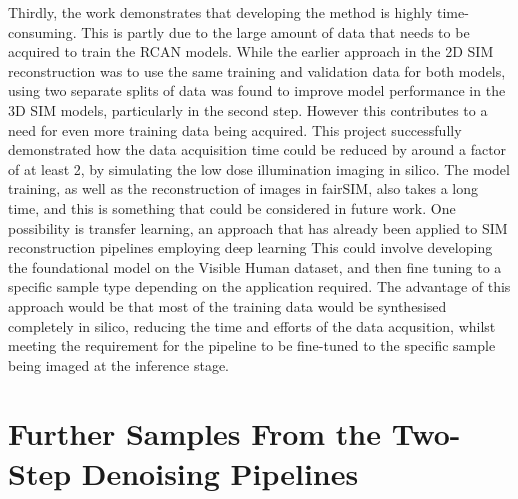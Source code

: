 \documentclass[12pt]{article}
\begin{document}
Thirdly, the work demonstrates that developing the method is highly time-consuming.
This is partly due to the large amount of data that needs to be acquired to train the RCAN models.
While the earlier approach in the 2D SIM reconstruction was to use the same training and validation data for both models,
using two separate splits of data was found to improve model performance in the 3D SIM models,
particularly in the second step.
However this contributes to a need for even more training data being acquired.
This project successfully demonstrated how the data acquisition time could be reduced by around a factor of at least 2,
by simulating the low dose illumination imaging in silico.
The model training, as well as the reconstruction of images in fairSIM,
also takes a long time, and this is something that could be considered in future work.
One possibility is transfer learning, an approach that has already been applied to SIM reconstruction pipelines employing deep learning \cite{mlsim}
This could involve developing the foundational model on the Visible Human dataset,
and then fine tuning to a specific sample type depending on the application required.
The advantage of this approach would be that most of the training data would be synthesised completely in silico,
reducing the time and efforts of the data acqusition,
whilst meeting the requirement for the pipeline to be fine-tuned to the specific sample being imaged at the inference stage.




\newpage

\appendix

\section{Further Samples From the Two-Step Denoising Pipelines}
\end{document}
